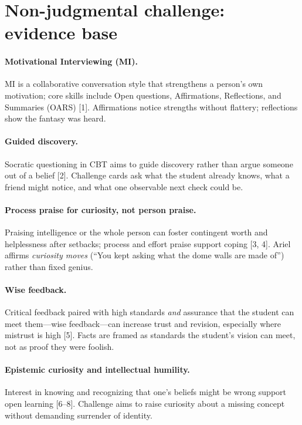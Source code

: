 \documentclass[11pt, a4paper]{article}
\begin{document}
\section{Non-judgmental challenge: evidence base}
\paragraph{Motivational Interviewing (MI).}
MI is a collaborative conversation style that strengthens a person's own motivation; core skills include Open questions, Affirmations, Reflections, and Summaries (OARS) [1]. Affirmations notice strengths without flattery; reflections show the fantasy was heard.

\paragraph{Guided discovery.}
Socratic questioning in CBT aims to guide discovery rather than argue someone out of a belief [2]. Challenge cards ask what the student already knows, what a friend might notice, and what one observable next check could be.

\paragraph{Process praise for curiosity, not person praise.}
Praising intelligence or the whole person can foster contingent worth and helplessness after setbacks; process and effort praise support coping [3, 4]. Ariel affirms \emph{curiosity moves} (``You kept asking what the dome walls are made of'') rather than fixed genius.

\paragraph{Wise feedback.}
Critical feedback paired with high standards \emph{and} assurance that the student can meet them---wise feedback---can increase trust and revision, especially where mistrust is high [5]. Facts are framed as standards the student's vision can meet, not as proof they were foolish.

\paragraph{Epistemic curiosity and intellectual humility.}
Interest in knowing and recognizing that one's beliefs might be wrong support open learning [6--8]. Challenge aims to raise curiosity about a missing concept without demanding surrender of identity.
\end{document}
